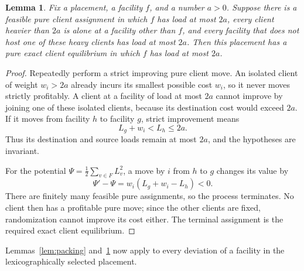 \documentclass[11pt]{amsart}
\newtheorem{lemma}[theorem]{Lemma}
\theoremstyle{definition}
\begin{document}
\begin{lemma}\label{lem:capped}
Fix a placement, a facility $f$, and a number $a>0$. Suppose there is a feasible pure client assignment in which $f$ has load at most $2a$, every client heavier than $2a$ is alone at a facility other than $f$, and every facility that does not host one of these heavy clients has load at most $2a$. Then this placement has a pure exact client equilibrium in which $f$ has load at most $2a$.
\end{lemma}
\begin{proof}
Repeatedly perform a strict improving pure client move. An isolated client of weight $w_i>2a$ already incurs its smallest possible cost $w_i$, so it never moves strictly profitably. A client at a facility of load at most $2a$ cannot improve by joining one of these isolated clients, because its destination cost would exceed $2a$. If it moves from facility $h$ to facility $g$, strict improvement means
\[
 L_g+w_i<L_h\le2a.
\]
Thus its destination and source loads remain at most $2a$, and the hypotheses are invariant.

For the potential $\Psi=\tfrac12\sum_{v\in F}L_v^2$, a move by $i$ from $h$ to $g$ changes its value by
\begin{equation}\label{eq:potential}
 \Psi'-\Psi=w_i(L_g+w_i-L_h)<0.
\end{equation}
There are finitely many feasible pure assignments, so the process terminates. No client then has a profitable pure move; since the other clients are fixed, randomization cannot improve its cost either. The terminal assignment is the required exact client equilibrium.
\end{proof}

Lemmas~\ref{lem:packing} and~\ref{lem:capped} now apply to every deviation of a facility in the lexicographically selected placement.
\end{document}
